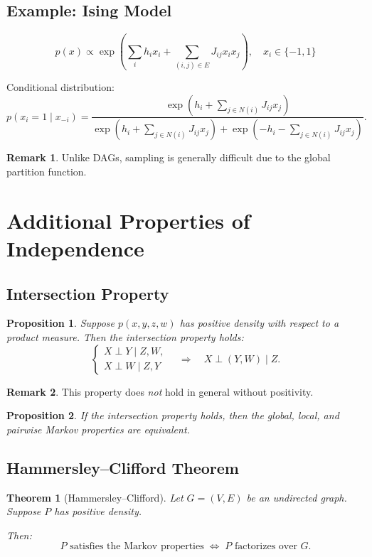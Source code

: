 \documentclass[12pt,oneside]{book}
\numberwithin{equation}{section}
\theoremstyle{definition}
\newtheorem{remark}{Remark}[section]
\theoremstyle{plain}
\newtheorem{theorem}{Theorem}[section]
\newtheorem{proposition}{Proposition}[section]
\theoremstyle{remark}
\begin{document}
\subsection{Example: Ising Model}

\[
p(x)
\propto
\exp\left(
\sum_i h_i x_i + \sum_{(i,j)\in E} J_{ij} x_i x_j
\right),
\quad x_i \in \{-1,1\}
\]

Conditional distribution:
\[
p(x_i = 1 \mid x_{-i})
=
\frac{\exp(h_i + \sum_{j\in N(i)} J_{ij} x_j)}
{\exp(h_i + \sum_{j\in N(i)} J_{ij} x_j) + \exp(-h_i - \sum_{j\in N(i)} J_{ij} x_j)}.
\]

\begin{remark}
Unlike DAGs, sampling is generally difficult due to the global partition function.
\end{remark}

\section{Additional Properties of Independence}

\subsection*{Intersection Property}

\begin{proposition}
Suppose $p(x,y,z,w)$ has positive density with respect to a product measure. Then the \emph{intersection property} holds:
\[
\begin{cases}
X \perp Y \mid Z, W, \\
X \perp W \mid Z, Y
\end{cases}
\quad \Rightarrow \quad
X \perp (Y,W) \mid Z.
\]
\end{proposition}

\begin{remark}
This property does \emph{not} hold in general without positivity.
\end{remark}

\begin{proposition}
If the intersection property holds, then the global, local, and pairwise Markov properties are equivalent.
\end{proposition}


\subsection*{Hammersley--Clifford Theorem}

\begin{theorem}[Hammersley--Clifford]
Let $G=(V,E)$ be an undirected graph. Suppose $P$ has positive density.

Then:
\[
P \text{ satisfies the Markov properties}
\;\Longleftrightarrow\;
P \text{ factorizes over } G.
\]
\end{theorem}
\end{document}
